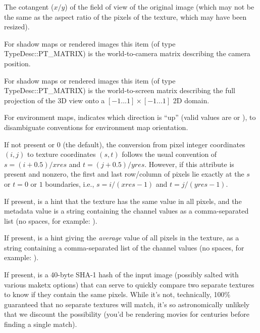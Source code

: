 The cotangent ($x/y$) of the field of view of the original image (which
may not be the same as the aspect ratio of the pixels of the texture,
which may have been resized).
\apiend

For shadow maps or rendered images this item (of type {\cf TypeDesc::PT_MATRIX})
is the world-to-camera matrix describing the camera position.
\apiend

For shadow maps or rendered images this item (of type {\cf TypeDesc::PT_MATRIX})
is the world-to-screen matrix describing the full projection of the 3D
view onto a $[-1...1] \times [-1...1]$ 2D domain.
\apiend

For environment maps, indicates which direction is ``up'' (valid values
are  or ), to disambiguate conventions for environment map
orientation.
\apiend

If not present or 0 (the default), the conversion from pixel integer
coordinates $(i,j)$ to texture coordinates $(s,t)$ follows the usual
convention of $s = (i+0.5)/\mathit{xres}$ and $t = (j+0.5)/\mathit{yres}$.
However, if this attribute is present and nonzero, the first and last
row/column of pixels lie exactly at the $s$ or $t = 0$ or $1$
boundaries, i.e., $s = i/(\mathit{xres}-1)$ and $t = j/(\mathit{yres}-1)$.
\apiend

If present, is a hint that the texture has the same value in all pixels,
and the metadata value is a string containing the channel values as
a comma-separated list (no spaces, for example: ).
\apiend

If present, is a hint giving the \emph{average} value of all pixels in the
texture, as a string containing a comma-separated list of the channel values
(no spaces, for example: ).
\apiend

If present, is a 40-byte SHA-1 hash of the input image (possibly salted with
various maketx options) that can serve to quickly compare two separate
textures to know if they contain the same pixels. While it's not, technically,
100\% guaranteed that no separate textures will match, it's so astronomically
unlikely that we discount the possibility (you'd be rendering movies for
centuries before finding a single match).
\apiend

